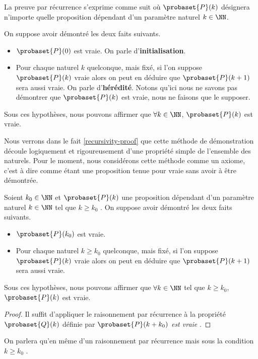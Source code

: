 \begin{fact} \label{recursivity}
	La preuve par récurrence s'exprime comme suit où $\probaset{P}(k)$ désignera n'importe quelle proposition dépendant d'un paramètre naturel $k \in \NN$.

	\medskip

	On suppose avoir démontré les deux faits suivants.
	
	\begin{itemize}[label=\small\textbullet]
		\item $\probaset{P}(0)$ est vraie. On parle d'\textbf{initialisation}.

		\item Pour chaque naturel $k$ quelconque, mais fixé, si l'on suppose $\probaset{P}(k)$ vraie alors on peut en déduire que $\probaset{P}(k+1)$ sera aussi vraie. On parle d'\textbf{hérédité}. Notons qu'ici nous ne savons pas démontrer que $\probaset{P}(k)$ est vraie, nous ne faisons que le supposer.
	\end{itemize}

	Sous ces hypothèses, nous pouvons affirmer que $\forall k \in \NN$, $\probaset{P}(k)$ est vraie.
\end{fact}


\begin{remark}
	Nous verrons dans le fait \ref{recursivity-proof} que cette méthode de démonstration découle logiquement et rigoureusement d'une propriété simple de l'ensemble des naturels.
	Pour le moment, nous considérons cette méthode comme un axiome, c'est à dire comme étant une proposition tenue pour vraie sans avoir à être démontrée.  
\end{remark}


\begin{fact}
	Soient $k_0 \in \NN$ et $\probaset{P}(k)$ une proposition dépendant d'un paramètre naturel $k \in \NN$ tel que $k \geq k_0$ .
	On suppose avoir démontré les deux faits suivants.
	
	\begin{itemize}[label=\small\textbullet]
		\item $\probaset{P}(k_0)$ est vraie.

		\item Pour chaque naturel $k \geq k_0$ quelconque, mais fixé, si l'on suppose $\probaset{P}(k)$ vraie alors on peut en déduire que $\probaset{P}(k+1)$ sera aussi vraie.
	\end{itemize}

	Sous ces hypothèses, nous pouvons affirmer que $\forall k \in \NN$ tel que $k \geq k_0$, $\probaset{P}(k)$ est vraie.
\end{fact}


\begin{proof}
	Il suffit d'appliquer le raisonnement par récurrence à la propriété $\probaset{Q}(k)$ définie par \emph{\og $\probaset{P}(k + k_0)$ est vraie \fg}.
\end{proof}


\begin{remark}
	On parlera qu'en même d'un raisonnement par récurrence mais sous la condition $k \geq k_0$ .  
\end{remark}

